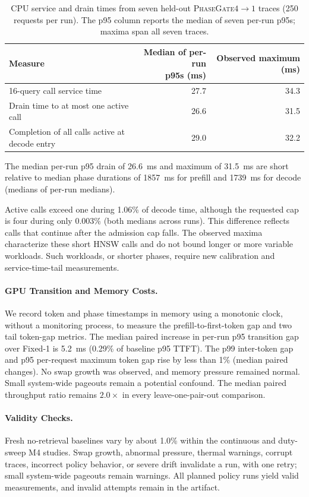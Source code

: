 \documentclass{article}
\newcommand{\system}{\textsc{PhaseGate}\xspace}
\newcommand{\gate}[2]{\system $#1{\rightarrow}#2$}
\begin{document}
\begin{table}[h]
\centering
\caption{CPU service and drain times from seven held-out \gate{4}{1} traces (250 requests per run). The p95 column reports the median of seven per-run p95s; maxima span all seven traces.}
\label{tab:transition-audit}
\small
\begin{tabular}{lrr}
\toprule
Measure & \shortstack{Median of per-run\\p95s (ms)} & Observed maximum (ms) \\
\midrule
16-query call service time & 27.7 & 34.3 \\
Drain time to at most one active call & 26.6 & 31.5 \\
Completion of all calls active at decode entry & 29.0 & 32.2 \\
\bottomrule
\end{tabular}
\end{table}

The median per-run p95 drain of 26.6~ms and maximum of 31.5~ms are short relative to median phase durations of 1857~ms for prefill and 1739~ms for decode (medians of per-run medians).

Active calls exceed one during 1.06\% of decode time, although the requested cap is four during only 0.003\% (both medians across runs).
This difference reflects calls that continue after the admission cap falls.
The observed maxima characterize these short HNSW calls and do not bound longer or more variable workloads.
Such workloads, or shorter phases, require new calibration and service-time-tail measurements.
\FloatBarrier

\paragraph{GPU Transition and Memory Costs.}
We record token and phase timestamps in memory using a monotonic clock, without a monitoring process, to measure the prefill-to-first-token gap and two tail token-gap metrics.
The median paired increase in per-run p95 transition gap over Fixed-1 is 5.2~ms (0.29\% of baseline p95 TTFT).
The p99 inter-token gap and p95 per-request maximum token gap rise by less than 1\% (median paired changes).
No swap growth was observed, and memory pressure remained normal.
Small system-wide pageouts remain a potential confound.
The median paired throughput ratio remains $2.0\times$ in every leave-one-pair-out comparison.

\paragraph{Validity Checks.}
Fresh no-retrieval baselines vary by about 1.0\% within the continuous and duty-sweep M4 studies.
Swap growth, abnormal pressure, thermal warnings, corrupt traces, incorrect policy behavior, or severe drift invalidate a run, with one retry; small system-wide pageouts remain warnings.
All planned policy runs yield valid measurements, and invalid attempts remain in the artifact.
\end{document}

